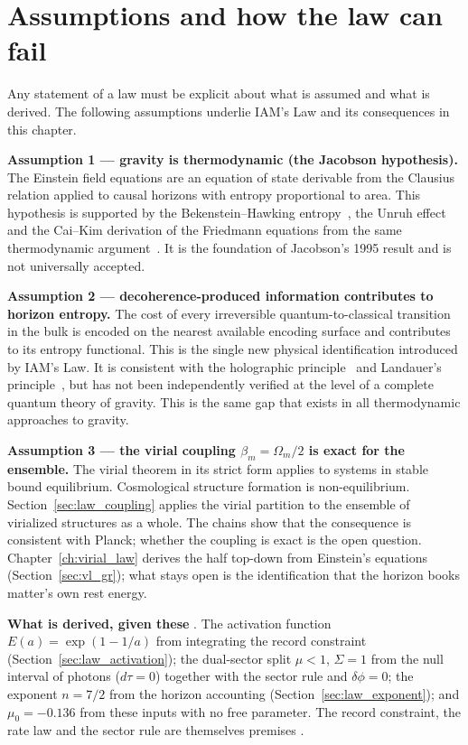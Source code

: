 \section{Assumptions and how the law can fail}\label{sec:assumptions}
Any statement of a law must be explicit about what is assumed and what is derived. The following assumptions underlie IAM's Law and its consequences in
this chapter.

\textbf{Assumption 1 --- gravity is thermodynamic (the Jacobson hypothesis).} The Einstein field equations are an equation of state derivable from the
Clausius relation applied to causal horizons with entropy proportional to area. This hypothesis is supported by the Bekenstein--Hawking
entropy~\cite{Bekenstein1973,Hawking1975}, the Unruh effect~\cite{Unruh1976} and the Cai--Kim derivation of the Friedmann equations from the same
thermodynamic argument~\cite{CaiKim2005}. It is the foundation of Jacobson's 1995 result and is not universally accepted.

\textbf{Assumption 2 --- decoherence-produced information contributes to horizon entropy.} The cost of every irreversible quantum-to-classical transition
in the bulk is encoded on the nearest available encoding surface and contributes to its entropy functional. This is the single new physical identification
introduced by IAM's Law. It is consistent with the holographic principle~\cite{tHooft1993,Susskind1995,Bousso2002} and Landauer's
principle~\cite{Landauer1961}, but has not been independently verified at the level of a complete quantum theory of gravity. This is the same gap that
exists in all thermodynamic approaches to gravity.

\textbf{Assumption 3 --- the virial coupling $\beta_m=\Omega_m/2$ is exact for the ensemble.} The virial theorem in its strict form applies to
systems in stable bound equilibrium. Cosmological structure formation is non-equilibrium. Section~\ref{sec:law_coupling} applies the virial partition to the
ensemble of virialized structures as a whole. The chains show that the consequence is consistent with Planck; whether the coupling is exact is the open question. Chapter~\ref{ch:virial_law} derives the half top-down from Einstein's equations (Section~\ref{sec:vl_gr}); what stays open is the identification that the horizon books matter's own rest energy.

\textbf{What is derived, given these} \derived. The activation function $E(a)=\exp(1-1/a)$ from integrating the record constraint
(Section~\ref{sec:law_activation}); the dual-sector split $\mu<1$, $\Sigma=1$ from the null interval of photons ($d\tau=0$) together with the sector rule and
$\delta\phi=0$; the exponent $n=7/2$ from the horizon accounting (Section~\ref{sec:law_exponent}); and $\mu_0=-0.136$ from these inputs with no free
parameter. The record constraint, the rate law and the sector rule are themselves premises \conjecture.

